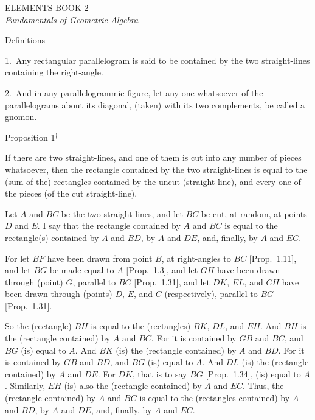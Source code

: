 \pagestyle{plain}
\begin{center}
{\Huge ELEMENTS BOOK 2}\\
\spa\spa\spa
{\huge\it Fundamentals of Geometric Algebra}
\end{center}\newpage

\pagestyle{fancy}
\cfoot{\gr{\thepage}}

\begin{center}
{\large Definitions}
\end{center}

1.~Any rectangular parallelogram is said to be contained by the two
 straight-lines containing the right-angle.
 
2.~And in any parallelogrammic figure, let any one whatsoever of the parallelograms about
its diagonal,  (taken) with its two complements, be called
a gnomon.


\begin{center}
{\large Proposition 1$^\dag$}
\end{center}

If there are two straight-lines, and one of them is cut into any number of pieces whatsoever, then the rectangle contained by the two straight-lines is
equal to the (sum of the) rectangles contained by the uncut (straight-line), and every one of the pieces (of the cut straight-line).

\epsfysize=2.2in
\centerline{}

Let $A$ and $BC$ be the two straight-lines, and let $BC$ be cut, at random,
at points $D$ and $E$. I say that the rectangle contained by $A$ and $BC$ is equal
to the rectangle(s) contained by $A$ and $BD$, by $A$ and $DE$, and, finally, by $A$ and
$EC$.

For let $BF$ have been drawn from point $B$, at right-angles to $BC$ [Prop.~1.11],
and let $BG$ be made equal to $A$ [Prop.~1.3], and let $GH$ have been drawn through
(point) $G$, parallel to $BC$ [Prop.~1.31], and let $DK$, $EL$, and $CH$ have been drawn through (points) $D$, $E$, and $C$ (respectively), parallel to $BG$ [Prop.~1.31].

So the (rectangle) $BH$ is equal to the (rectangles) $BK$, $DL$, and $EH$. And
$BH$ is  the (rectangle contained) by $A$ and $BC$. For it is contained by $GB$ and $BC$, and $BG$ (is) equal to $A$. And  $BK$ (is) the (rectangle contained) by $A$ and $BD$.
For it is contained by $GB$ and $BD$, and $BG$ (is) equal to $A$. And $DL$ (is) the (rectangle contained) by $A$ and $DE$.
For $DK$, that is to say $BG$ [Prop.~1.34], (is) equal to $A$. Similarly, $EH$ (is)
also the (rectangle contained) by $A$ and $EC$. Thus, the (rectangle contained) by $A$ and $BC$ is
equal to the (rectangles contained) by $A$ and $BD$,  by $A$ and $DE$, and, finally,
by $A$ and $EC$.

